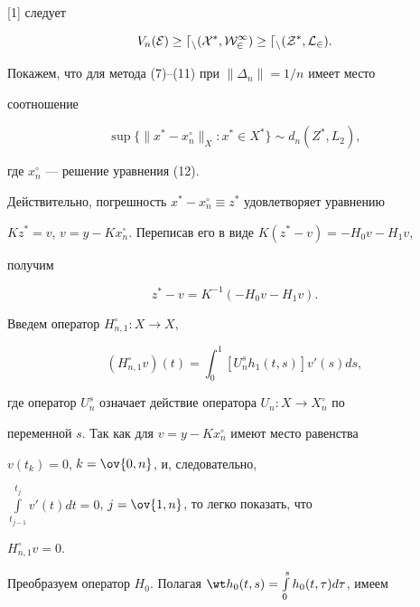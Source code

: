[1] следует 


\begin{equation} 


V_n(\cal E)\ge d_n(X^*,W^1_2)\ge d_n(Z^*,L_2). 


\end{equation} 


 


Покажем, что для метода (7)--(11) при $\|\Delta_n\|=1/n$ имеет место 


соотношение 


$$ 


\sup\{\|x^*-x^\circ_n\|_X:x^*\in X^*\}\sim d_n(Z^*,L_2), 


$$ 


где $x^\circ_n$ --- решение уравнения (12). 


 


Действительно, погрешность $x^*-x^\circ_n\equiv z^*$ удовлетворяет уравнению 


$Kz^*=v$, $v=y-Kx^\circ_n$. Переписав его в виде $K(z^*-v)=-H_0v-H_1v$, 


получим 


\begin{equation} 


z^*-v=K^{-1}(-H_0v-H_1v). 


\end{equation} 


 


Введем оператор $H^\circ_{n,1}:X\to X$,


$$ 


(H^\circ_{n,1}v)(t)=\int^1_0[U^s_n h_1(t,s)]v'(s)ds, 


$$ 


где оператор $U^s_n$ означает действие оператора $U_n:X\to X^\circ_n$ по 


переменной $s$. Так как для $v=y-Kx^\circ_n$ имеют место равенства 


$v(t_k)=0$, $k=\ov{0,n}$, и, следовательно, 


$\int\limits^{t_j}_{t_{j-1}}v'(t)dt=0$, $j=\ov{1,n}$, то легко показать, что 


$H^\circ_{n,1}v=0$. 


 


Преобразуем оператор $H_0$. Полагая $\wt h_0(t,s)=\int\limits^s_0 


h_0(t,\tau)d\tau$, имеем 



